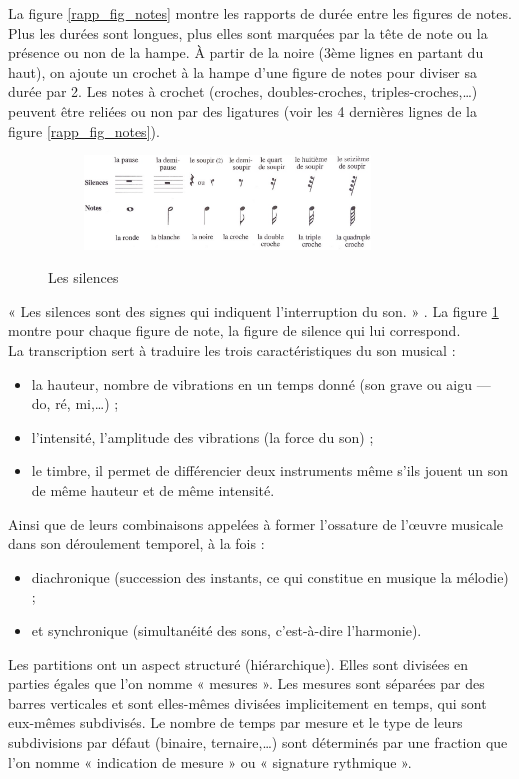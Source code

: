 La figure \ref{rapp_fig_notes} montre les rapports de durée entre les figures
de notes. Plus les durées sont longues, plus elles sont marquées par la tête de
note ou la présence ou non de la hampe. À partir de la noire (3ème lignes en
partant du haut), on ajoute un crochet à la hampe d’une figure de notes pour
diviser sa durée par 2. 
Les notes à crochet (croches, doubles-croches, triples-croches,…) 
peuvent être reliées ou non par des ligatures (voir les 4 dernières lignes de
la figure \ref{rapp_fig_notes}).\newpage
\begin{figure}[h]
	\centering
	\includegraphics[height=25mm, width=95mm]{
    z_images/3_methodes/0_notation_de_la_batterie/4_silences.png}
	\caption{Les silences}\cite{danhauser}
	\label{silences}
\end{figure}
« Les silences sont des signes qui indiquent l’interruption du son. »
\cite{danhauser}. La figure \ref{silences} montre pour chaque figure de note,
la figure de silence qui lui correspond.\\

La transcription sert à traduire les trois caractéristiques du son musical :
\begin{itemize}
	\item la hauteur, nombre de vibrations en un temps donné (son grave ou
        aigu — do, ré, mi,…) ;
	\item l’intensité, l’amplitude des vibrations (la force du son) ;
	\item le timbre, il permet de différencier deux instruments même s’ils
        jouent un son de même hauteur et de même intensité.
\end{itemize}

Ainsi que de leurs combinaisons appelées à former l’ossature de l’œuvre
musicale dans son déroulement temporel, à la fois :
\begin{itemize}
	\item diachronique (succession des instants, ce qui constitue en musique la
        mélodie) ;
	\item et synchronique (simultanéité des sons, c’est-à-dire l’harmonie).\\
\end{itemize}

Les partitions ont un aspect structuré (hiérarchique). Elles sont divisées en
parties égales que l’on nomme « mesures ». Les mesures sont séparées par des
barres verticales et sont elles-mêmes divisées implicitement en temps, qui sont
eux-mêmes subdivisés. Le nombre de temps par mesure et le type de leurs
subdivisions par défaut (binaire, ternaire,…) sont déterminés par une fraction
que l’on nomme « indication de mesure » ou « signature rythmique ».\\


